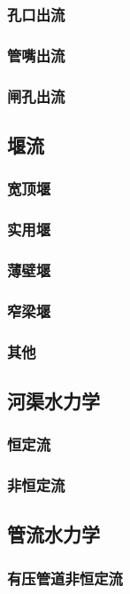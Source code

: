 \documentclass[UTF8]{../../ApplicationUniverse}
\begin{document}
        \subsubsection{孔口出流}
        \subsubsection{管嘴出流}
        \subsubsection{闸孔出流}
    \subsection{堰流}
        \subsubsection{宽顶堰}
        \subsubsection{实用堰}
        \subsubsection{薄壁堰}
        \subsubsection{窄梁堰}
        \subsubsection{其他}
    \subsection{河渠水力学}
        \subsubsection{恒定流}
        \subsubsection{非恒定流}
    \subsection{管流水力学}
        \subsubsection{有压管道非恒定流}
\end{document}
